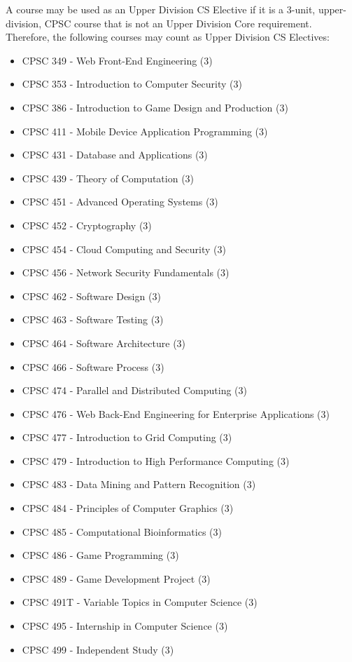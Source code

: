 \documentclass{book}
\begin{document}
A course may be used as an Upper Division CS Elective if it is a
3-unit, upper-division, CPSC course that is not an Upper Division Core
requirement. Therefore, the following courses may count as Upper
Division CS Electives:
\begin{itemize}
\item CPSC 349 - Web Front-End Engineering (3)
\item CPSC 353 - Introduction to Computer Security (3)
\item CPSC 386 - Introduction to Game Design and Production (3)
\item CPSC 411 - Mobile Device Application Programming (3)
\item CPSC 431 - Database and Applications (3)
\item CPSC 439 - Theory of Computation (3)
\item CPSC 451 - Advanced Operating Systems (3)
\item CPSC 452 - Cryptography (3)
\item CPSC 454 - Cloud Computing and Security (3)
\item CPSC 456 - Network Security Fundamentals (3)
\item CPSC 462 - Software Design (3)
\item CPSC 463 - Software Testing (3)
\item CPSC 464 - Software Architecture (3)
\item CPSC 466 - Software Process (3)
\item CPSC 474 - Parallel and Distributed Computing (3)
\item CPSC 476 - Web Back-End Engineering for Enterprise Applications (3)
\item CPSC 477 - Introduction to Grid Computing (3)
\item CPSC 479 - Introduction to High Performance Computing (3)
\item CPSC 483 - Data Mining and Pattern Recognition (3)
\item CPSC 484 - Principles of Computer Graphics (3)
\item CPSC 485 - Computational Bioinformatics (3)
\item CPSC 486 - Game Programming (3)
\item CPSC 489 - Game Development Project (3)
\item CPSC 491T - Variable Topics in Computer Science (3)
\item CPSC 495 - Internship in Computer Science (3)
\item CPSC 499 - Independent Study (3)
\end{itemize}
\end{document}
